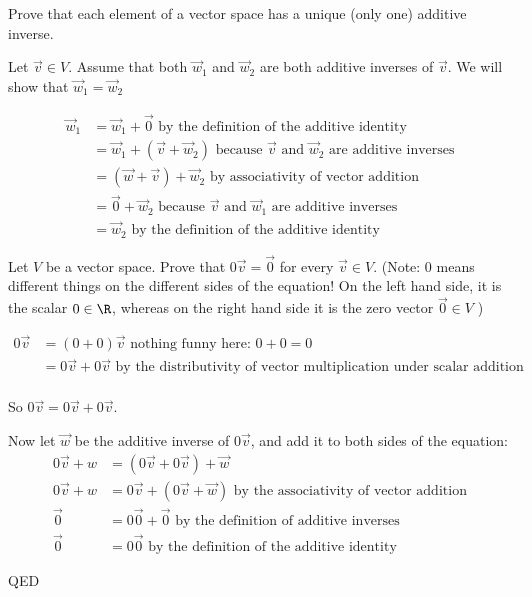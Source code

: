 \documentclass{ximera}
\begin{document}
Prove that each element of a vector space has a unique (only one) additive inverse.
\begin{free-response}
  Let $\vec{v} \in V$.  Assume that both $\vec{w}_1$ and $\vec{w}_2$ are both additive inverses of $\vec{v}$.  We will show that $\vec{w}_1=\vec{w}_2$
  
  \begin{align*}
    \vec{w}_1&= \vec{w}_1+\vec{0} \text{ by the definition of the additive identity}\\
    &= \vec{w}_1+\left(\vec{v}+ \vec{w}_2\right) \text{ because $\vec{v}$ and $\vec{w}_2$ are additive inverses}\\
    &=\left( \vec{w}+\vec{v}\right)+\vec{w}_2 \text{ by associativity of vector addition}\\
    &= \vec{0}+\vec{w}_2 \text{ because $\vec{v}$ and $\vec{w}_1$ are additive inverses}\\
    &= \vec{w}_2 \text{ by the definition of the additive identity}
  \end{align*}
\end{free-response}
	

Let $V$ be a vector space. Prove that $0\vec{v} = \vec{0}$ for every $\vec{v} \in V$. (Note: $0$ means different things on the different sides of the equation!  On
the left hand side, it is the scalar $0\in\R$, whereas on the right hand side it is the zero vector $\vec{0} \in V$ )

\begin{free-response}
  
  \begin{align*}
    0\vec{v} &= (0+0)\vec{v} \text{ nothing funny here:  $0+0=0$}\\
    &=0\vec{v}+0\vec{v} \text{ by the distributivity of vector multiplication under scalar addition}\\
  \end{align*}
  
  So $0\vec{v} = 0\vec{v}+0\vec{v}$.
  
  Now let $\vec{w}$ be the additive inverse of $0\vec{v}$, and add it to both sides of the equation:
  \begin{align*}
    0\vec{v}+w &= \left(0\vec{v}+0\vec{v} \right) + \vec{w}\\
    0\vec{v}+w & = 0\vec{v}+\left( 0\vec{v} +\vec{w}\right) \text{ by the associativity of vector addition}\\
    \vec{0} &= 0\vec{0}+\vec{0} \text{ by the definition of additive inverses}\\
    \vec{0}&= 0\vec{0} \text{ by the definition of the additive identity}
  \end{align*}
  
  QED
\end{free-response}
\end{document}

